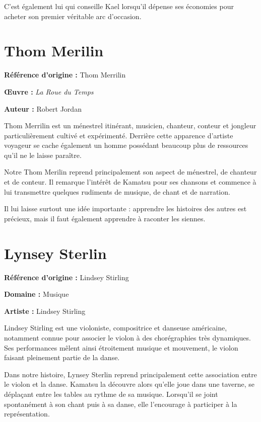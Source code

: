 C'est également lui qui conseille Kael lorsqu'il dépense ses économies pour
acheter son premier véritable arc d'occasion.

\section*{Thom Merilin}

\textbf{Référence d'origine :} Thom Merrilin

\textbf{Œuvre :} \textit{La Roue du Temps}

\textbf{Auteur :} Robert Jordan

Thom Merrilin est un ménestrel itinérant, musicien, chanteur, conteur et
jongleur particulièrement cultivé et expérimenté. Derrière cette apparence
d'artiste voyageur se cache également un homme possédant beaucoup plus de
ressources qu'il ne le laisse paraître.

Notre Thom Merilin reprend principalement son aspect de ménestrel, de chanteur
et de conteur. Il remarque l'intérêt de Kamatsu pour ses chansons et commence
à lui transmettre quelques rudiments de musique, de chant et de narration.

Il lui laisse surtout une idée importante : apprendre les histoires des autres
est précieux, mais il faut également apprendre à raconter les siennes.


\section*{Lynsey Sterlin}

\textbf{Référence d'origine :} Lindsey Stirling

\textbf{Domaine :} Musique

\textbf{Artiste :} Lindsey Stirling


Lindsey Stirling est une violoniste, compositrice et danseuse américaine,
notamment connue pour associer le violon à des chorégraphies très dynamiques.
Ses performances mêlent ainsi étroitement musique et mouvement, le violon
faisant pleinement partie de la danse.


Dans notre histoire, Lynsey Sterlin reprend principalement cette association
entre le violon et la danse. Kamatsu la découvre alors qu'elle joue dans une
taverne, se déplaçant entre les tables au rythme de sa musique. Lorsqu'il se
joint spontanément à son chant puis à sa danse, elle l'encourage à participer
à la représentation.

